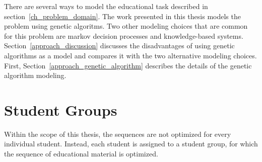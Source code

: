 \label{ch_approach}
There are several ways to model the educational task described in
section~\ref{ch_problem_domain}. The work presented in this thesis models the
problem using genetic algoritms. Two other modeling choices that are common for
this problem are markov decision processes and knowledge-based systems.
Section~\ref{approach_discussion} discusses the disadvantages of using genetic
algorithms as a model and compares it with the two alternative modeling
choices. First, Section~\ref{approach_genetic_algorithm} describes the details
of the genetic algorithm modeling.

\section{Student Groups}
Within the scope of this thesis, the sequences are not optimized for every
individual student. Instead, each student is assigned to a student group, for
which the sequence of educational material is optimized.
